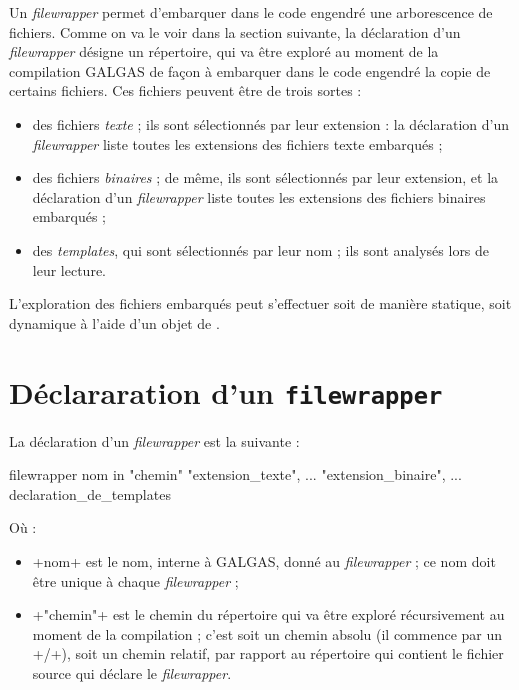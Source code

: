 



Un \emph{filewrapper} permet d'embarquer dans le code engendré une arborescence de fichiers. Comme on va le voir dans la section suivante, la déclaration d'un \emph{filewrapper} désigne un répertoire, qui va être exploré au moment de la compilation GALGAS de façon à embarquer dans le code engendré la copie de certains fichiers. Ces  fichiers peuvent être de trois sortes :
\begin{itemize}
  \item des fichiers \emph{texte} ; ils sont sélectionnés par leur extension : la déclaration d'un \emph{filewrapper} liste toutes les extensions des fichiers texte embarqués ;
  \item des fichiers \emph{binaires} ; de même, ils sont sélectionnés par leur extension, et la déclaration d'un \emph{filewrapper} liste toutes les extensions des fichiers binaires embarqués ;
  \item des \emph{templates}, qui sont sélectionnés par leur nom ; ils sont analysés lors de leur lecture.
\end{itemize}


L'exploration des fichiers embarqués peut s'effectuer soit de manière statique, soit dynamique à l'aide d'un objet de .









\section{Déclararation d'un \texttt{filewrapper}}

La déclaration d'un \emph{filewrapper} est la suivante :

\begin{galgas4box}
filewrapper nom in "chemin" {
 "extension_texte", ...
}{
 "extension_binaire", ...
}{
 declaration_de_templates
}
\end{galgas4box}

Où :
\begin{itemize}
  \item \ggsq+nom+ est le nom, interne à GALGAS, donné au \emph{filewrapper} ; ce nom doit être unique à chaque \emph{filewrapper} ;
  \item \ggsq+"chemin"+ est le chemin du répertoire qui va être exploré récursivement au moment de la compilation ; c'est soit un chemin absolu (il commence par un \ggsq+/+), soit un chemin relatif, par rapport au répertoire qui contient le fichier source qui déclare le \emph{filewrapper}.
\end{itemize}

